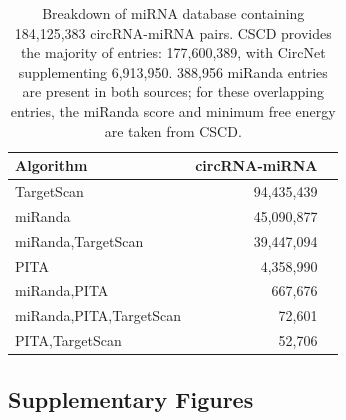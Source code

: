 \begin{table}[ht]
  \centering
  \caption[Breakdown of miRNA database]{Breakdown of miRNA database containing 184,125,383 circRNA-miRNA pairs. CSCD provides the majority of entries: 177,600,389, with CircNet supplementing 6,913,950. 388,956 miRanda entries are present in both sources; for these overlapping entries, the miRanda score and minimum free energy are taken from CSCD.}
  \label{pycircdbsupptab7}
  \begin{tabular}{lrr}
    \toprule
    Algorithm & circRNA-miRNA \\
    \midrule
    TargetScan & 94,435,439  \\
    miRanda & 45,090,877  \\
    miRanda,TargetScan & 39,447,094  \\
    PITA & 4,358,990 \\
    miRanda,PITA & 667,676 \\
    miRanda,PITA,TargetScan & 72,601 \\
    PITA,TargetScan & 52,706 \\
    \bottomrule
  \end{tabular}
\end{table}

\clearpage


\subsection{Supplementary Figures}


